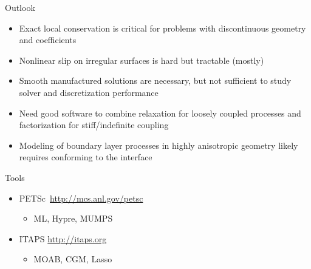 \documentclass{beamer}
\begin{document}
\begin{frame}{Outlook}
  \begin{block}{}
    \begin{itemize}
    \item Exact local conservation is critical for problems with discontinuous geometry and coefficients
    \item Nonlinear slip on irregular surfaces is hard but tractable (mostly)
    \item Smooth manufactured solutions are necessary, but not sufficient to study solver and discretization performance
    \item Need good software to combine relaxation for loosely coupled processes and factorization
      for stiff/indefinite coupling
    \item Modeling of boundary layer processes in highly anisotropic geometry likely requires conforming to the interface
    \end{itemize}    
  \end{block}
  \begin{block}{Tools}
    \begin{itemize}
    \item PETSc\ \url{http://mcs.anl.gov/petsc}
      \begin{itemize}\item ML, Hypre, MUMPS
      \end{itemize}
    \item ITAPS \url{http://itaps.org}
      \begin{itemize}\item MOAB, CGM, Lasso
      \end{itemize}
    \end{itemize}
  \end{block}
\end{frame}
\end{document}
